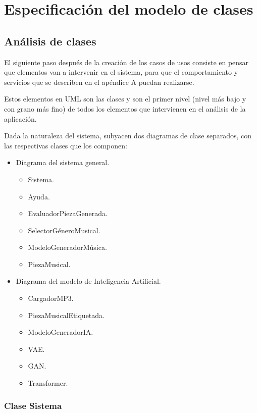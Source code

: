 
\chapter{Especificación del modelo de clases}
\label{apendice-b}
\section{Análisis de clases}

El siguiente paso después de la creación de los casos de usos consiste en pensar que elementos van a intervenir en el sistema, para que el comportamiento y servicios que se describen en el apéndice A\cite{apendice-a} puedan realizarse.

Estos elementos en UML son las clases y son el primer nivel (nivel más bajo y con grano más fino) de todos los elementos que intervienen en el análisis de la aplicación.

Dada la naturaleza del sistema, subyacen dos diagramas de clase separados, con las respectivas clases que los componen:
\begin{itemize}
    \item Diagrama del sistema general.
    \begin{itemize}
        \item Sistema.
        \item Ayuda.
        \item EvaluadorPiezaGenerada.
        \item SelectorGéneroMusical.
        \item ModeloGeneradorMúsica.
        \item PiezaMusical.
    \end{itemize}
    \item Diagrama del modelo de Inteligencia Artificial.
    \begin{itemize}
        \item CargadorMP3.
        \item PiezaMusicalEtiquetada.
        \item ModeloGeneradorIA.
        \item VAE.
        \item GAN.
        \item Transformer.
    \end{itemize}
\end{itemize}

\subsection{Clase Sistema}

